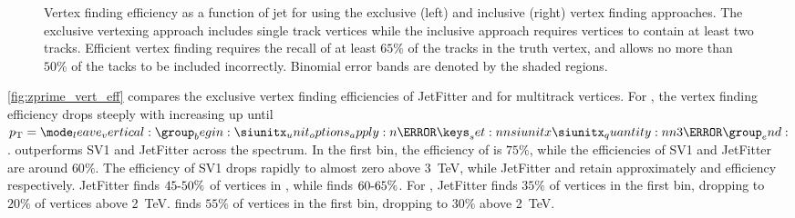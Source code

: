 \begin{figure}[!htbp]
\begin{subfigure}[b]{0.48\textwidth}
    \end{subfigure}
    \caption{
        Vertex finding efficiency as a function of jet \pt for \ttbarbjets using the exclusive (left) and inclusive (right) vertex finding approaches.
        The exclusive vertexing approach includes single track vertices while the inclusive approach requires vertices to contain at least two tracks.
        Efficient vertex finding requires the recall of at least $65\%$ of the tracks in the truth vertex, and allows no more than $50\%$ of the tacks to be included incorrectly.
        Binomial error bands are denoted by the shaded regions.}
    \label{fig:ttbar_vert_eff}
\end{figure}

\cref{fig:zprime_vert_eff} compares the exclusive vertex finding efficiencies of JetFitter and \GNN for multitrack vertices.
For \Zprimebjets, the vertex finding efficiency drops steeply with increasing \pt up until $\pt = \SI{3}{\TeV}$.
\GNN outperforms SV1 and JetFitter across the \pt spectrum.
In the first bin, the efficiency of \GNN is $75\%$, while the efficiencies of SV1 and JetFitter are around $60\%$.
The efficiency of SV1 drops rapidly to almost zero above \SI{3}{\TeV}, while JetFitter and \GNN retain approximately  and  efficiency respectively.
JetFitter finds $45\text{\nobreakdash-}50\%$ of vertices in \ttbarbjets, while \GNN finds $60\text{\nobreakdash-}65\%$.
For \Zprimebjets, JetFitter finds $35\%$ of vertices in the first bin, dropping to $20\%$ of vertices above \SI{2}{\TeV}.
\GNN finds $55\%$ of vertices in the first bin, dropping to $30\%$ above \SI{2}{\TeV}.

